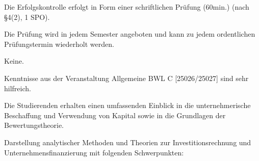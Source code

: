 \begin{course}

\setdoclanguagegerman
{}



\coursehead


\label{cour_6835.dp_997}


\begin{styleenv}
\begin{assessment}
Die Erfolgskontrolle erfolgt in Form einer schriftlichen Prüfung (60min.) (nach §4(2), 1 SPO).

 

Die Prüfung wird in jedem Semester angeboten und kann zu jedem ordentlichen Prüfungstermin wiederholt werden.


\end{assessment}

\begin{conditions}Keine.\end{conditions}

\begin{recommendations}Kenntnisse aus der Veranstaltung Allgemeine BWL C [25026/25027] sind sehr hilfreich.

\end{recommendations}
\end{styleenv}

\begin{learningoutcomes}
Die Studierenden erhalten einen umfassenden Einblick in die unternehmerische Beschaffung und Verwendung von Kapital sowie in die Grundlagen der Bewertungstheorie.


\end{learningoutcomes}

\begin{content}
Darstellung analytischer Methoden und Theorien zur Investitionsrechnung und Unternehmensfinanzierung mit folgenden Schwerpunkten:


\end{content}
\end{course}
